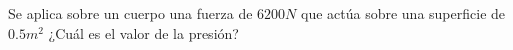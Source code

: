 
\question Se aplica sobre un cuerpo una fuerza de $ 6200 N$ que actúa sobre
una superficie de $0.5 m^2$ ¿Cuál es el valor de la presión?

